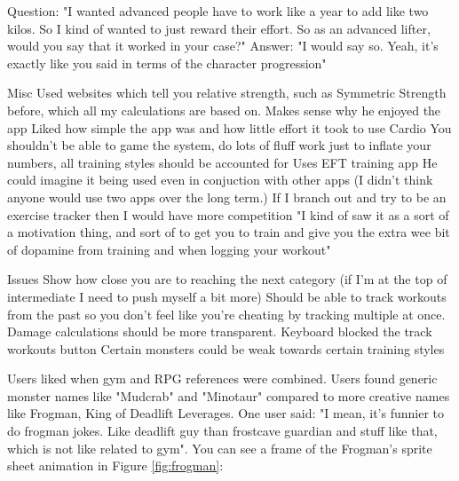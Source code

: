 \documentclass{l4proj}
\begin{document}
  Question: "I wanted advanced people have to work like a year to add like two kilos. So I kind of wanted to just reward their effort. So as an advanced lifter, would you say that it worked in your case?"
    Answer: "I would say so. Yeah, it's exactly like you said in terms of the character progression"

  Misc
    Used websites which tell you relative strength, such as Symmetric Strength before, which all my calculations are based on. Makes sense why he enjoyed the app
    Liked how simple the app was and how little effort it took to use
    Cardio 
    You shouldn't be able to game the system, do lots of fluff work just to inflate your numbers, all training styles should be accounted for 
    Uses EFT training app
    He could imagine it being used even in conjuction with other apps (I didn't think anyone would use two apps over the long term.)
    If I branch out and try to be an exercise tracker then I would have more competition
    "I kind of saw it as a sort of a motivation thing, and sort of to get you to train and give you the extra wee bit of dopamine from training and when logging your workout"

  Issues
    Show how close you are to reaching the next category (if I'm at the top of intermediate I need to push myself a bit more)
    Should be able to track workouts from the past so you don't feel like you're cheating by tracking multiple at once.
    Damage calculations should be more transparent.
    Keyboard blocked the track workouts button
    Certain monsters could be weak towards certain training styles




    










Users liked when gym and RPG references were combined. Users found generic monster names like "Mudcrab" and "Minotaur" compared to more creative names like Frogman, King of Deadlift Leverages. One user said: "I mean, it's funnier to do frogman jokes. Like deadlift guy than frostcave guardian and stuff like that, which is not like related to gym". You can see a frame of the Frogman's sprite sheet animation in Figure \ref{fig:frogman}:
\end{document}
